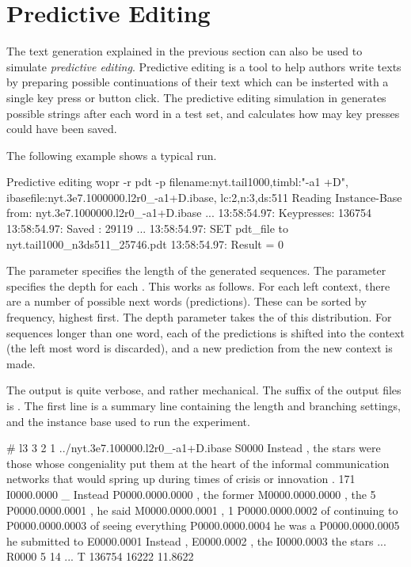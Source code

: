 \documentclass[a4paper,10pt,twoside]{report}
\begin{document}
\section{Predictive Editing}

The text generation explained in the previous section can also be used to
simulate \emph{predictive editing}. Predictive editing is a tool to help authors
write texts by preparing possible continuations of their text which can be
insterted with a single key press or button click. The predictive editing
simulation in \wopr{} generates possible strings after each word in a test set,
and calculates how may key presses could have been saved.

The following example shows a typical run.

\begin{bash}{Predictive editing}
wopr -r pdt -p filename:nyt.tail1000,timbl:"-a1 +D",
               ibasefile:nyt.3e7.1000000.l2r0_-a1+D.ibase,
               lc:2,n:3,ds:511
Reading Instance-Base from: nyt.3e7.1000000.l2r0_-a1+D.ibase
...
13:58:54.97: Keypresses: 136754
13:58:54.97: Saved     : 29119
...
13:58:54.97: SET pdt_file to nyt.tail1000_n3ds511_25746.pdt
13:58:54.97: Result = 0
\end{bash}

The  parameter specifies the length of the generated sequences. The
 parameter specifies the depth for each . This works as
follows. For each left context, there are a number of possible next words
(predictions). These can be sorted by frequency, highest first. The depth
parameter takes the  of this distribution. For sequences longer than one
word, each of the predictions is shifted into the context (the left most word is
discarded), and a new prediction from the new context is made.

The output is quite verbose, and rather mechanical. The suffix of the output
files is . The first line is a summary line containing the length and
branching settings, and the instance base used to run the experiment.

\begin{wout}{}
# l3 3 2 1 ../nyt.3e7.100000.l2r0_-a1+D.ibase
S0000 Instead , the stars were those whose congeniality put them at the
heart of the informal communication networks that would spring up during
times of crisis or innovation .  171
I0000.0000 _ Instead
P0000.0000.0000 , the former
M0000.0000.0000 , the 5
P0000.0000.0001 , he said
M0000.0000.0001 , 1
P0000.0000.0002 of continuing to
P0000.0000.0003 of seeing everything
P0000.0000.0004 he was a
P0000.0000.0005 he submitted to
E0000.0001 Instead ,
E0000.0002 , the
I0000.0003 the stars
...
R0000 5 14
...
T 136754 16222 11.8622
\end{wout}
\end{document}
